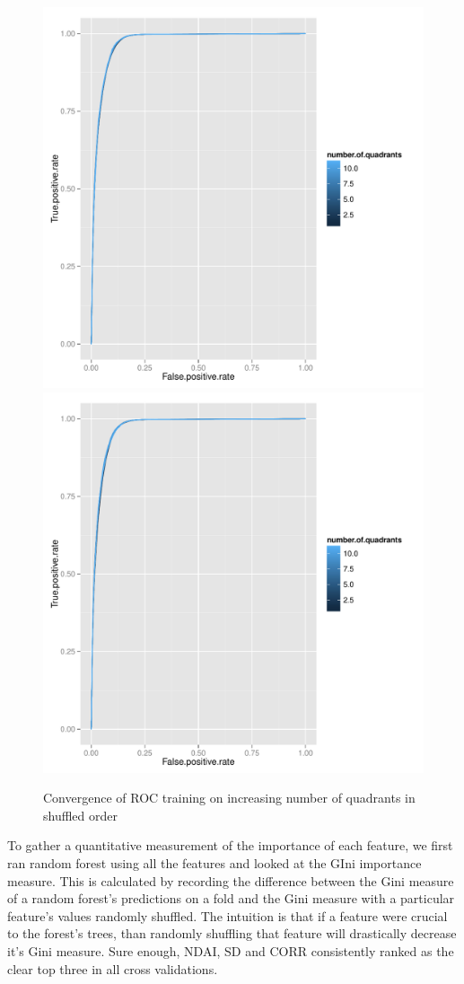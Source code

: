 \documentclass{article}\usepackage[]{graphicx}\usepackage[]{color}
\begin{document}
  \begin{figure}[H]
  \includegraphics[width=\linewidth, height = 180pts ]{ROC_converge_shuffle1.pdf}
\endminipage\hfill
{}
  \includegraphics[width=\linewidth, height = 180pts]{ROC_converge_shuffle2.pdf}
\endminipage\hfill
  \caption{Convergence of ROC training on increasing number of quadrants in shuffled order}\label{}
\end{figure}
  
To gather a quantitative measurement of the importance of each feature, we first ran random forest using all the features and looked at the GIni importance measure.  This is calculated by recording the difference between the Gini measure of a random forest's predictions on a fold and the Gini measure with a particular feature's values randomly shuffled.  The intuition is that if a feature were crucial to the forest's trees, than randomly shuffling that feature will drastically decrease it's Gini measure.  Sure enough, NDAI, SD and CORR   consistently ranked as the clear top three in all cross validations. \\
\end{document}
